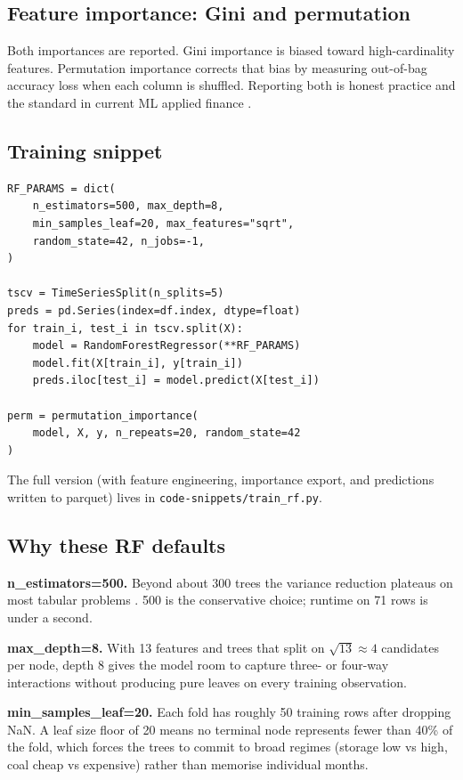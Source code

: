 \documentclass[11pt,letterpaper]{article}
\begin{document}
\subsection{Feature importance: Gini and permutation}

Both importances are reported. Gini importance is biased toward high-cardinality features. Permutation importance corrects that bias by measuring out-of-bag accuracy loss when each column is shuffled. Reporting both is honest practice and the standard in current ML applied finance \parencite{lopezdeprado2018}.

\subsection{Training snippet}

\begin{lstlisting}
RF_PARAMS = dict(
    n_estimators=500, max_depth=8,
    min_samples_leaf=20, max_features="sqrt",
    random_state=42, n_jobs=-1,
)

tscv = TimeSeriesSplit(n_splits=5)
preds = pd.Series(index=df.index, dtype=float)
for train_i, test_i in tscv.split(X):
    model = RandomForestRegressor(**RF_PARAMS)
    model.fit(X[train_i], y[train_i])
    preds.iloc[test_i] = model.predict(X[test_i])

perm = permutation_importance(
    model, X, y, n_repeats=20, random_state=42
)
\end{lstlisting}

The full version (with feature engineering, importance export, and predictions written to parquet) lives in \texttt{code-snippets/train\_rf.py}.

\subsection{Why these RF defaults}

\textbf{n\_estimators=500.} Beyond about 300 trees the variance reduction plateaus on most tabular problems \parencite{breiman2001rf}. 500 is the conservative choice; runtime on 71 rows is under a second.

\textbf{max\_depth=8.} With 13 features and trees that split on $\sqrt{13}\approx 4$ candidates per node, depth 8 gives the model room to capture three- or four-way interactions without producing pure leaves on every training observation.

\textbf{min\_samples\_leaf=20.} Each fold has roughly 50 training rows after dropping NaN. A leaf size floor of 20 means no terminal node represents fewer than 40\% of the fold, which forces the trees to commit to broad regimes (storage low vs high, coal cheap vs expensive) rather than memorise individual months.
\end{document}
